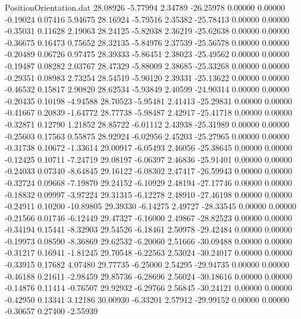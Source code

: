 \begin{filecontents}{PositionOrientation.dat}
  28.08926   -5.77994    2.34789   -26.25978    0.00000    0.00000   -0.19024    0.07416    5.94675
  28.16924   -5.79516    2.35382   -25.78413    0.00000    0.00000   -0.35031    0.11628    2.19063
  28.24125   -5.82038    2.36219   -25.62638    0.00000    0.00000   -0.36675    0.16473    0.75652
  28.32135   -5.84976    2.37539   -25.56578    0.00000    0.00000   -0.20489    0.06726    0.97475
  28.39333   -5.86451    2.38023   -25.49562    0.00000    0.00000   -0.19487    0.08282    2.03767
  28.47329   -5.88009    2.38685   -25.33268    0.00000    0.00000   -0.29351    0.08983    2.73254
  28.54519   -5.90120    2.39331   -25.13622    0.00000    0.00000   -0.46532    0.15817    2.90820
  28.62534   -5.93849    2.40599   -24.90314    0.00000    0.00000   -0.20435    0.10198   -4.94588
  28.70523   -5.95481    2.41413   -25.29831    0.00000    0.00000   -0.41667    0.20839   -1.64772
  28.77738   -5.98487    2.42917   -25.41718    0.00000    0.00000   -0.32871    0.12790    1.21852
  28.85722   -6.01112    2.43938   -25.31989    0.00000    0.00000   -0.25603    0.17563    0.55875
  28.92924   -6.02956    2.45203   -25.27965    0.00000    0.00000   -0.31738    0.10672   -1.33614
  29.00917   -6.05493    2.46056   -25.38645    0.00000    0.00000   -0.12425    0.10711   -7.24719
  29.08197   -6.06397    2.46836   -25.91401    0.00000    0.00000   -0.24033    0.07340   -8.64845
  29.16122   -6.08302    2.47417   -26.59943    0.00000    0.00000   -0.32724    0.09668   -7.19870
  29.24152   -6.10929    2.48194   -27.17746    0.00000    0.00000   -0.18832    0.09997   -3.97224
  29.31315   -6.12278    2.48910   -27.46198    0.00000    0.00000   -0.24911    0.10200  -10.89805
  29.39330   -6.14275    2.49727   -28.33545    0.00000    0.00000   -0.21566    0.01746   -6.12449
  29.47327   -6.16000    2.49867   -28.82523    0.00000    0.00000   -0.34194    0.15441   -8.32903
  29.54526   -6.18461    2.50978   -29.42484    0.00000    0.00000   -0.19973    0.08590   -8.36869
  29.62532   -6.20060    2.51666   -30.09488    0.00000    0.00000   -0.31217    0.16941   -1.81245
  29.70548   -6.22563    2.53024   -30.24017    0.00000    0.00000   -0.33915    0.17682    4.07480
  29.77735   -6.25000    2.54295   -29.94735    0.00000    0.00000   -0.46188    0.21611   -2.98459
  29.85736   -6.28696    2.56024   -30.18616    0.00000    0.00000   -0.14876    0.11414   -0.76507
  29.92932   -6.29766    2.56845   -30.24121    0.00000    0.00000   -0.42950    0.13341    3.12186
  30.00930   -6.33201    2.57912   -29.99152    0.00000    0.00000   -0.30657    0.27400   -2.55939

\end{filecontents}
